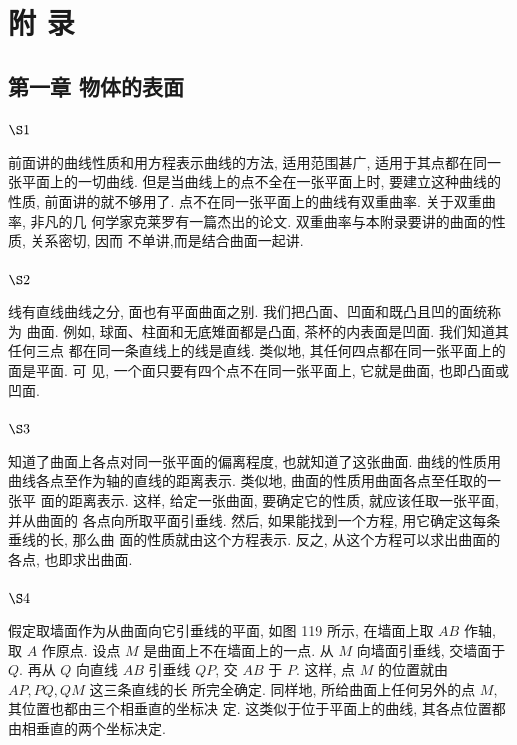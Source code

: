 \part{附 录}
\chapter{第一章 物体的表面}
\section{$\S 1$}
前面讲的曲线性质和用方程表示曲线的方法, 适用范围甚广, 适用于其点都在同一 张平面上的一切曲线. 但是当曲线上的点不全在一张平面上时, 要建立这种曲线的性质, 前面讲的就不够用了. 点不在同一张平面上的曲线有双重曲率. 关于双重曲率, 非凡的几 何学家克莱罗有一篇杰出的论文. 双重曲率与本附录要讲的曲面的性质, 关系密切, 因而 不单讲,而是结合曲面一起讲.

\section{$\S 2$}

线有直线曲线之分, 面也有平面曲面之别. 我们把凸面、凹面和既凸且凹的面统称为 曲面. 例如, 球面、柱面和无底雉面都是凸面, 茶杯的内表面是凹面. 我们知道其任何三点 都在同一条直线上的线是直线. 类似地, 其任何四点都在同一张平面上的面是平面. 可 见, 一个面只要有四个点不在同一张平面上, 它就是曲面, 也即凸面或凹面.

\section{$\S 3$}

知道了曲面上各点对同一张平面的偏离程度, 也就知道了这张曲面. 曲线的性质用 曲线各点至作为轴的直线的距离表示. 类似地, 曲面的性质用曲面各点至任取的一张平 面的距离表示. 这样, 给定一张曲面, 要确定它的性质, 就应该任取一张平面, 并从曲面的 各点向所取平面引垂线. 然后, 如果能找到一个方程, 用它确定这每条垂线的长, 那么曲 面的性质就由这个方程表示. 反之, 从这个方程可以求出曲面的各点, 也即求出曲面.

\section{$\S 4$}
假定取墙面作为从曲面向它引垂线的平面, 如图 119 所示, 在墙面上取 $A B$ 作轴, 取 $A$ 作原点. 设点 $M$ 是曲面上不在墙面上的一点. 从 $M$ 向墙面引垂线, 交墙面于 $Q$. 再从 $Q$ 向直线 $A B$ 引垂线 $Q P$, 交 $A B$ 于 $P$. 这样, 点 $M$ 的位置就由 $A P, P Q, Q M$ 这三条直线的长 所完全确定. 同样地, 所给曲面上任何另外的点 $M$, 其位置也都由三个相垂直的坐标决 定. 这类似于位于平面上的曲线, 其各点位置都由相垂直的两个坐标决定.


